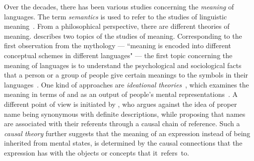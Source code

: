 Over the decades, there has been various studies concerning the \emph{meaning} of languages. The term \emph{semantics} is used to refer to the studies of linguistic meaning~\citep{katz1972, palmer1981semantics}. From a philosophical perspective, there are different theories of meaning. \citet{lewis1970} describes two topics of the studies of meaning. Corresponding to the first observation from the mythology --- ``meaning is encoded into different conceptual schemes in different languages" --- the first topic concerning the meaning of languages is to understand the psychological and sociological facts that a person or a group of people give certain meanings to the symbols in their languages~\citep{lewis1970}. One kind of approaches are \emph{ideational theories}~\citep{ChapmanRoutledge+2009+84+85}, which examines the meaning in terms of and as an output of people's mental representations~\citep{Stich1994-STIMR}. A different point of view is initiated by \citet{Kripke1980-KRINAN}, who argues against the idea of proper name being synonymous with definite descriptions, while proposing that names are associated with their referents through a causal chain of reference. Such a \emph{causal theory} further suggests that the meaning of an expression instead of being inherited from mental states, is determined by the causal connections that the expression has with the objects or concepts that it~refers~to. 

